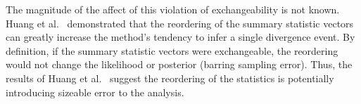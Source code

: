 {The magnitude of the affect of this violation of exchangeability is not known.
Huang et al.\ \cite{Huang2011} demonstrated that the reordering of the summary
statistic vectors can greatly increase the method's tendency to infer a single
divergence event.
By definition, if the summary statistic vectors were exchangeable, the
reordering would not change the likelihood or posterior (barring sampling
error).
Thus, the results of Huang et al.\ \cite{Huang2011} suggest the reordering of
the statistics is potentially introducing sizeable error to the analysis.
}



